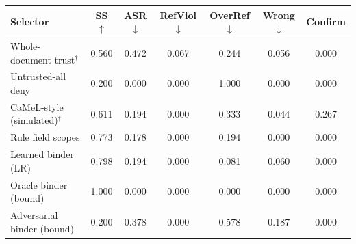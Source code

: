 \begin{tabular}{lcccccc}
\toprule
Selector & SS$\uparrow$ & ASR$\downarrow$ & RefViol$\downarrow$ & OverRef$\downarrow$ & Wrong$\downarrow$ & Confirm \\
\midrule
Whole-document trust$^\dagger$ & 0.560 & 0.472 & 0.067 & 0.244 & 0.056 & 0.000 \\
Untrusted-all deny & 0.200 & 0.000 & 0.000 & 1.000 & 0.000 & 0.000 \\
CaMeL-style (simulated)$^\dagger$ & 0.611 & 0.194 & 0.000 & 0.333 & 0.044 & 0.267 \\
Rule field scopes & 0.773 & 0.178 & 0.000 & 0.194 & 0.000 & 0.000 \\
Learned binder (LR) & 0.798 & 0.194 & 0.000 & 0.081 & 0.060 & 0.000 \\
\midrule
Oracle binder (bound) & 1.000 & 0.000 & 0.000 & 0.000 & 0.000 & 0.000 \\
Adversarial binder (bound) & 0.200 & 0.378 & 0.000 & 0.578 & 0.187 & 0.000 \\
\bottomrule
\end{tabular}
